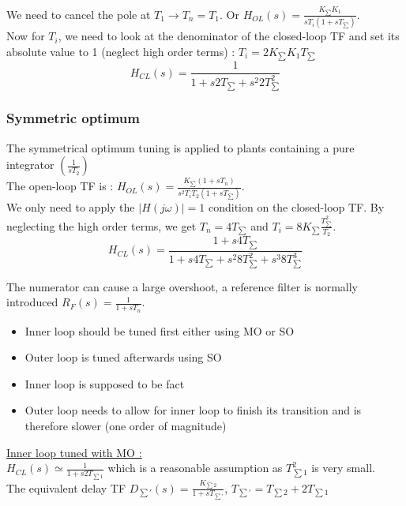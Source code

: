 \documentclass[../main.tex]{subfiles}
\begin{document}
We need to cancel the pole at $T_1 \rightarrow T_n = T_1$. Or $H_{OL}(s) = \frac{K_{\sum} K_1}{sT_i( 1+sT_{\sum})}$.\\

Now for $T_i$, we need to look at the denominator of the closed-loop TF and set its absolute value to 1 (neglect high order terms) : $T_i = 2K_{\sum} K_1 T_{\sum}$\\
\begin{equation}
    H_{CL}(s) = \frac{1}{1 + s2 T_{\sum} + s^2 2 T_{\sum}^2}
\end{equation}

\subsubsection{Symmetric optimum}
The symmetrical optimum tuning is applied to plants containing a pure integrator $(\frac{1}{sT_2})$\\

The open-loop TF is : $H_{OL}(s) = \frac{K_{\sum} (1+sT_n)}{s^2 T_i T_2 (1+ sT_{\sum})}$.\\

We only need to apply the $\lvert H(j\omega)\rvert =1$ condition on the closed-loop TF. By neglecting the high order terms, we get $T_n = 4T_{\sum}$ and $T_i = 8 K_{\sum} \frac{T_{\sum}^2}{T_2}$.\\
\begin{equation}
    H_{CL}(s) = \frac{1 + s4 T_{\sum}}{1+s4T_{\sum} + s^2 8 T_{\sum}^2 + s^3 8 T_{\sum}^3}
\end{equation}

\warning The numerator can cause a large overshoot, a reference filter is normally introduced $R_F(s) = \frac{1}{1+sT_n}$.\\

\begin{itemize}
    \item Inner loop should be tuned first either using MO or SO
    \item Outer loop is tuned afterwards using SO
    \item Inner loop is supposed to be fact
    \item Outer loop needs to allow for inner loop to finish its transition and is therefore slower (one order of magnitude)
\end{itemize}

\quad \underline{Inner loop tuned with MO :}\\
$H_{CL}(s) \simeq \frac{1}{1+s2T_{\sum 1}}$ which is a reasonable assumption as $T_{\sum 1}^2$ is very small.\\
The equivalent delay TF $D_{\sum'}(s) = \frac{K_{\sum 2}}{1+sT_{\sum'}}$, $T_{\sum'} = T_{\sum 2} + 2T_{\sum 1}$\\
\end{document}
